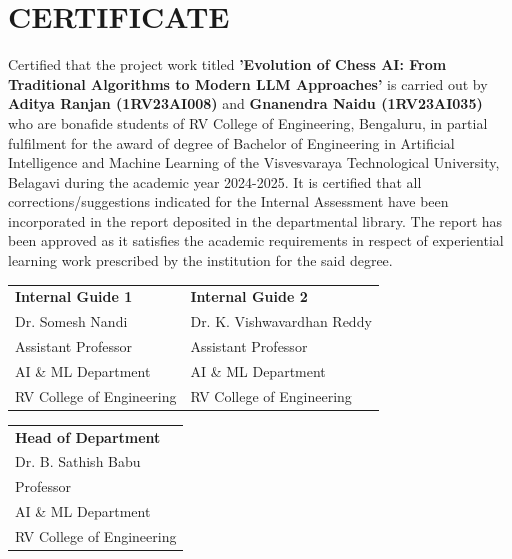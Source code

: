 \documentclass[11pt,a4paper]{report}
\begin{document}
\pagestyle{fancy}



\newpage

\chapter*{CERTIFICATE}
\thispagestyle{fancy}

\vspace{0.5cm}

Certified that the project work titled \textbf{'Evolution of Chess AI: From Traditional Algorithms to Modern LLM Approaches'} is carried out by \textbf{Aditya Ranjan (1RV23AI008)} and \textbf{Gnanendra Naidu (1RV23AI035)} who are bonafide students of RV College of Engineering, Bengaluru, in partial fulfilment for the award of degree of Bachelor of Engineering in Artificial Intelligence and Machine Learning of the Visvesvaraya Technological University, Belagavi during the academic year 2024-2025. It is certified that all corrections/suggestions indicated for the Internal Assessment have been incorporated in the report deposited in the departmental library. The report has been approved as it satisfies the academic requirements in respect of experiential learning work prescribed by the institution for the said degree.

\vspace{2cm}

\begin{center}
\begin{tabular}{p{6cm}p{6cm}}
\textbf{Internal Guide 1} & \textbf{Internal Guide 2} \\
Dr. Somesh Nandi & Dr. K. Vishwavardhan Reddy \\
Assistant Professor & Assistant Professor \\
AI \& ML Department & AI \& ML Department \\
RV College of Engineering & RV College of Engineering \\
\end{tabular}
\end{center}

\vspace{1cm}

\begin{center}
\begin{tabular}{p{6cm}}
\textbf{Head of Department} \\
Dr. B. Sathish Babu \\
Professor \\
AI \& ML Department \\
RV College of Engineering \\
\end{tabular}
\end{center}
\end{document}
